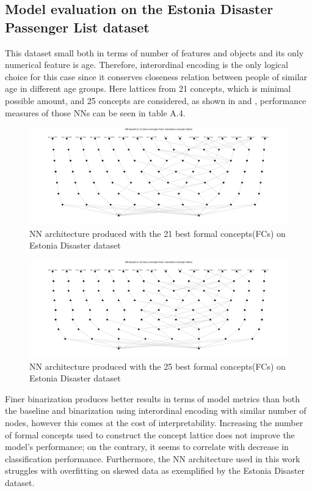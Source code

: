 \documentclass[14pt,a4paper]{extarticle}
\begin{document}
	\subsection{Model evaluation on the Estonia Disaster Passenger List dataset}
	
	This dataset small both in terms of number of features and objects and its only numerical feature is age. Therefore, interordinal encoding is the only logical choice for this case since it conserves closeness relation between people of similar age in different age groups. Here lattices from 21 concepts, which is minimal possible amount, and 25 concepts are considered, as shown in  and , performance measures of those NNs can be seen in table A.4.
	
	\begin{figure}[h]
		\centering
		\includegraphics[width=\textwidth]{media/eesti/NN_architecture_21concepts.png}
		\caption{NN architecture produced with the 21 best formal concepts(FCs) on Estonia Disaster dataset}
		\label{fig:21concepts}
	\end{figure}
	
	\begin{figure}[h]
		\centering
		\includegraphics[width=\textwidth]{media/eesti/NN_architecture_25concepts.png}
		\caption{NN architecture produced with the 25 best formal concepts(FCs) on Estonia Disaster dataset}
		\label{fig:25concepts}
	\end{figure}
	
	\begin{results}
		
		Finer binarization produces better results in terms of model metrics than both the baseline and binarization using interordinal encoding with similar number of nodes, however this comes at the cost of interpretability. Increasing the number of formal concepts used to construct the concept lattice does not improve the model's performance; on the contrary, it seems to correlate with decrease in classification performance. Furthermore, the NN architecture used in this work struggles with overfitting on skewed data as exemplified by the Estonia Disaster dataset.
		
	\end{results}
	
\end{document}
